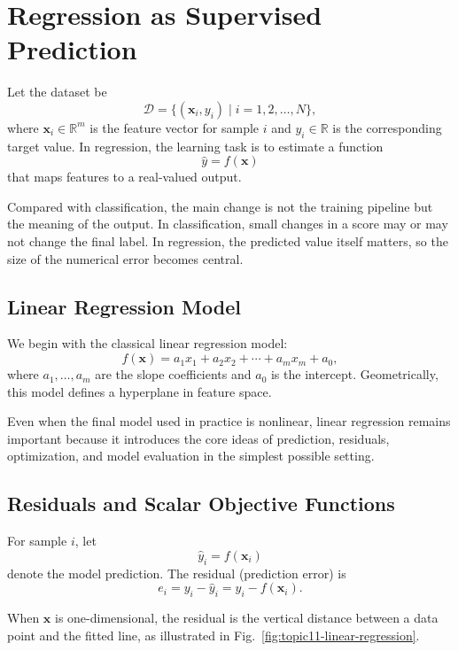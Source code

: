 \documentclass[12pt]{article}
\begin{document}
\section{Regression as Supervised Prediction}

Let the dataset be
\[
\mathcal{D} = \{(\mathbf{x}_i, y_i) \mid i = 1,2,\ldots,N\},
\]
where $\mathbf{x}_i \in \mathbb{R}^m$ is the feature vector for sample $i$ and $y_i \in \mathbb{R}$ is the corresponding target value. In regression, the learning task is to estimate a function
\[
\hat{y} = f(\mathbf{x})
\]
that maps features to a real-valued output.

Compared with classification, the main change is not the training pipeline but the meaning of the output. In classification, small changes in a score may or may not change the final label. In regression, the predicted value itself matters, so the size of the numerical error becomes central.

\subsection{Linear Regression Model}

We begin with the classical linear regression model:
\begin{equation}
f(\mathbf{x}) = a_1x_1 + a_2x_2 + \cdots + a_mx_m + a_0,
\label{eq:topic11-linear-model}
\end{equation}
where $a_1,\ldots,a_m$ are the slope coefficients and $a_0$ is the intercept. Geometrically, this model defines a hyperplane in feature space.

Even when the final model used in practice is nonlinear, linear regression remains important because it introduces the core ideas of prediction, residuals, optimization, and model evaluation in the simplest possible setting.

\subsection{Residuals and Scalar Objective Functions}

For sample $i$, let
\[
\hat{y}_i = f(\mathbf{x}_i)
\]
denote the model prediction. The residual (prediction error) is
\begin{equation}
e_i = y_i - \hat{y}_i = y_i - f(\mathbf{x}_i).
\end{equation}

When $\mathbf{x}$ is one-dimensional, the residual is the vertical distance between a data point and the fitted line, as illustrated in Fig.~\ref{fig:topic11-linear-regression}.
\end{document}
